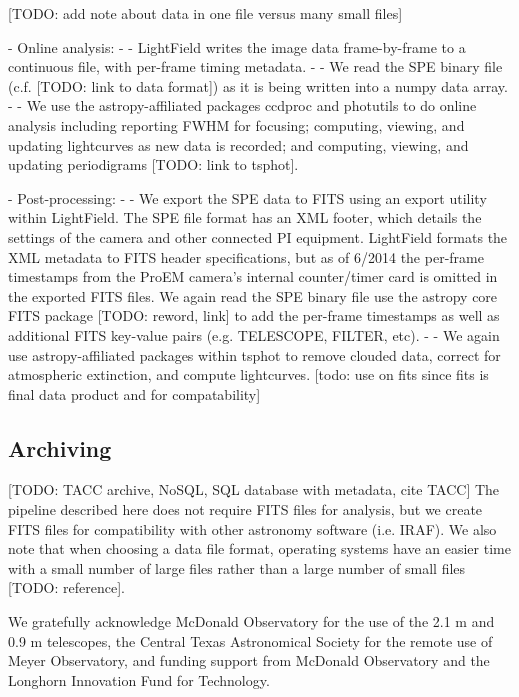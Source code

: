 \documentclass[preprint2]{aastex}
\begin{document}
[TODO: add note about data in one file versus many small files]

- Online analysis:
- - LightField writes the image data frame-by-frame to a continuous file, with per-frame timing metadata.
- - We read the SPE binary file (c.f. [TODO: link to data format]) as it is being written into a numpy data array.
- - We use the astropy-affiliated packages ccdproc and photutils to do online analysis including reporting FWHM for focusing; computing, viewing, and updating lightcurves as new data is recorded; and computing, viewing, and updating periodigrams [TODO: link to tsphot].

- Post-processing:
- - We export the SPE data to FITS using an export utility within LightField. The SPE file format has an XML footer, which details the settings of the camera and other connected PI equipment. LightField formats the XML metadata to FITS header specifications, but as of 6/2014 the per-frame timestamps from the ProEM camera's internal counter/timer card is omitted in the exported FITS files. We again read the SPE binary file use the astropy core FITS package [TODO: reword, link] to add the per-frame timestamps as well as additional FITS key-value pairs (e.g. TELESCOPE, FILTER, etc).
- - We again use astropy-affiliated packages within tsphot to remove clouded data, correct for atmospheric extinction, and compute lightcurves. [todo: use on fits since fits is final data product and for compatability]

\subsection{Archiving}

[TODO: TACC archive, NoSQL, SQL database with metadata, cite TACC] The pipeline described here does not require FITS files for analysis, but we create FITS files for compatibility with other astronomy software (i.e. IRAF). We also note that when choosing a data file format, operating systems have an easier time with a small number of large files rather than a large number of small files [TODO: reference].


\acknowledgments

We gratefully acknowledge McDonald Observatory for the use of the 2.1 m and 0.9 m telescopes, the Central Texas Astronomical Society for the remote use of Meyer Observatory, and funding support from McDonald Observatory and the Longhorn Innovation Fund for Technology.
\end{document}
